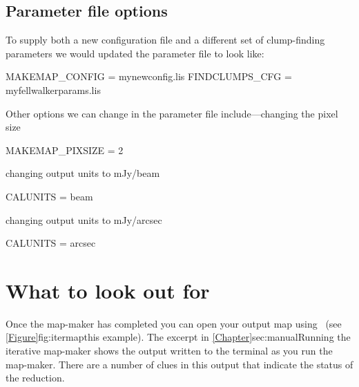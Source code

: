 \subsection{Parameter file options}

To supply both a new configuration file and a different set of
clump-finding parameters we would updated the parameter file
 to look like:

\begin{terminalv}
MAKEMAP_CONFIG = mynewconfig.lis
FINDCLUMPS_CFG = myfellwalkerparams.lis
\end{terminalv}

Other options we can change in the parameter file include---changing the pixel size

\begin{terminalv}
MAKEMAP_PIXSIZE = 2
\end{terminalv}

changing output units to mJy/beam

\begin{terminalv}
CALUNITS = beam
\end{terminalv}

changing output units to mJy/arcsec

\begin{terminalv}
CALUNITS = arcsec
\end{terminalv}



\section{What to look out for}
\flushbottom

Once the map-maker has completed you can open your output map using
\gaia\ (see \cref{Figure}{fig:itermap}{this example}). The excerpt in
\cref{Chapter}{sec:manual}{Running the iterative map-maker} shows the
output written to the terminal as you run the map-maker. There are a
number of clues in this output that indicate the status of the
reduction.


